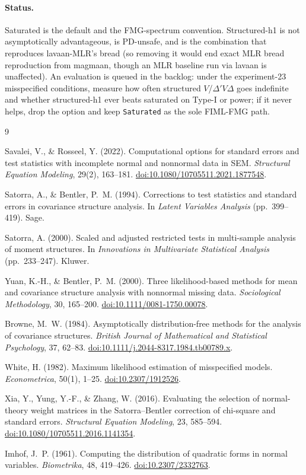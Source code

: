 \documentclass[11pt]{article}
\theoremstyle{plain}
\theoremstyle{remark}
\begin{document}
\paragraph{Status.} Saturated is the default and the FMG-spectrum convention.
Structured-h1 is not asymptotically advantageous, is PD-unsafe, and is the
combination that reproduces lavaan-MLR's bread (so removing it would end exact
MLR bread reproduction from magmaan, though an MLR baseline run via lavaan is
unaffected). An evaluation is queued in the backlog: under the experiment-23
misspecified conditions, measure how often structured \(V\)/\(\Delta'V\Delta\)
goes indefinite and whether structured-h1 ever beats saturated on Type-I or
power; if it never helps, drop the option and keep \texttt{Saturated} as the
sole FIML-FMG path.

\begin{thebibliography}{9}

 Savalei, V., \& Rosseel, Y. (2022). Computational
options for standard errors and test statistics with incomplete normal and
nonnormal data in SEM. \emph{Structural Equation Modeling}, 29(2), 163--181.
\href{https://doi.org/10.1080/10705511.2021.1877548}{doi:10.1080/10705511.2021.1877548}.

 Satorra, A., \& Bentler, P.~M. (1994). Corrections
to test statistics and standard errors in covariance structure analysis. In
\emph{Latent Variables Analysis} (pp.~399--419). Sage.

 Satorra, A. (2000). Scaled and adjusted restricted tests
in multi-sample analysis of moment structures. In \emph{Innovations in
Multivariate Statistical Analysis} (pp.~233--247). Kluwer.

 Yuan, K.-H., \& Bentler, P.~M. (2000). Three
likelihood-based methods for mean and covariance structure analysis with
nonnormal missing data. \emph{Sociological Methodology}, 30, 165--200.
\href{https://doi.org/10.1111/0081-1750.00078}{doi:10.1111/0081-1750.00078}.

 Browne, M.~W. (1984). Asymptotically distribution-free
methods for the analysis of covariance structures. \emph{British Journal of
Mathematical and Statistical Psychology}, 37, 62--83.
\href{https://doi.org/10.1111/j.2044-8317.1984.tb00789.x}{doi:10.1111/j.2044-8317.1984.tb00789.x}.

 White, H. (1982). Maximum likelihood estimation of
misspecified models. \emph{Econometrica}, 50(1), 1--25.
\href{https://doi.org/10.2307/1912526}{doi:10.2307/1912526}.

 Xia, Y., Yung, Y.-F., \& Zhang, W. (2016). Evaluating the
selection of normal-theory weight matrices in the Satorra--Bentler correction of
chi-square and standard errors. \emph{Structural Equation Modeling}, 23,
585--594.
\href{https://doi.org/10.1080/10705511.2016.1141354}{doi:10.1080/10705511.2016.1141354}.

 Imhof, J.~P. (1961). Computing the distribution of quadratic
forms in normal variables. \emph{Biometrika}, 48, 419--426.
\href{https://doi.org/10.2307/2332763}{doi:10.2307/2332763}.

\end{thebibliography}
\end{document}

